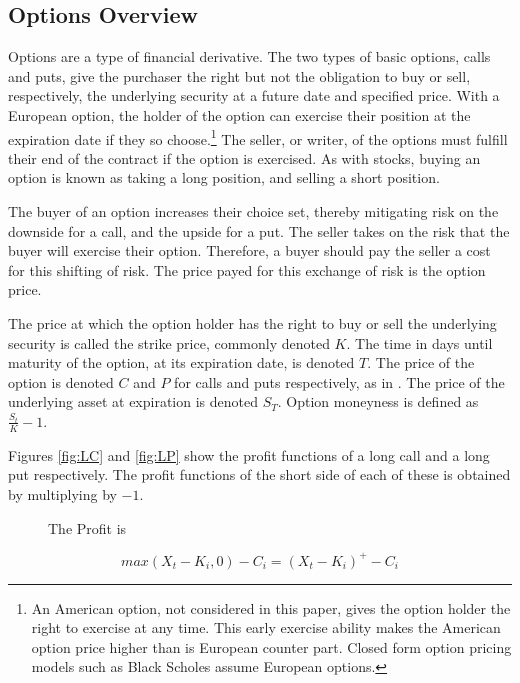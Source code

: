 \begin{appendix}
\section{Options Overview}\label{app:Options}

Options are a type of financial derivative. The two types of basic options, calls and puts, give the purchaser the right but not the obligation to buy or sell, respectively, the underlying security at a future date and specified price. With a European option, the holder of the option can exercise their position at the expiration date if they so choose.\footnote{An American option, not considered in this paper, gives the option holder the right to exercise at any time. This early exercise ability makes the American option price higher than is European counter part. Closed form option pricing models such as Black Scholes assume European options.} The seller, or writer, of the options must fulfill their end of the contract if the option is exercised. As with stocks, buying an option is known as taking a long position, and selling a short position.

The buyer of an option increases their choice set, thereby mitigating risk on the downside for a call, and the upside for a put. The seller takes on the risk that the buyer will exercise their option. Therefore, a buyer should pay the seller a cost for this shifting of risk. The price payed for this exchange of risk is the option price.

The price at which the option holder has the right to buy or sell the underlying security is called the strike price, commonly denoted $K$. The time in days until maturity of the option, at its expiration date, is denoted $T$. The price of the option is denoted $C$ and $P$ for calls and puts respectively, as in \cite{faias2017optimal}. The price of the underlying asset at expiration is denoted $S_{T}$. Option moneyness is defined as $\frac{S_{t}}{K} - 1$.

Figures \ref{fig:LC} and \ref{fig:LP} show the profit functions of a long call and a long put respectively. The profit functions of the short side of each of these is obtained by multiplying by $-1$.

\begin{figure}[!htb]
    \begin{minipage}{0.4\linewidth}
        The Profit is

        \[max(X_{t} - K_{i}, 0) - C_{i} = (X_{t} - K_{i})^{+} - C_{i}\]


\end{minipage}
\end{figure}
\end{appendix}
